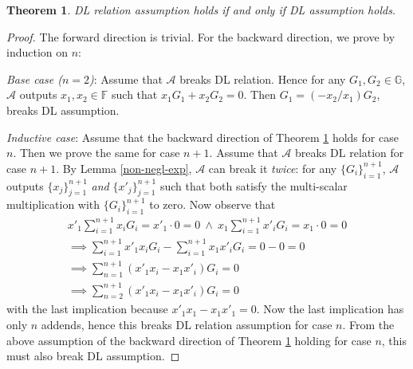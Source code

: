 \documentclass{article}
\newtheorem{theorem}{Theorem}[section]
\begin{document}
\begin{theorem}\label{equiv-demo}
DL relation assumption holds if and only if DL assumption holds.
\end{theorem}
\begin{proof}
The forward direction is trivial. For the backward direction, we prove by induction on $n$:

\textit{Base case ($n=2$)}: Assume that $\mathcal{A}$ breaks DL relation. Hence for any $G_1, G_2 \in \mathbb{G}$, $\mathcal{A}$ outputs $x_1, x_2 \in \mathbb{F}$ such that $x_1 G_1 + x_2 G_2 = 0$. Then $G_1 = (-x_2 / x_1) G_2$, breaks DL assumption.

\textit{Inductive case}: Assume that the backward direction of Theorem \ref{equiv-demo} holds for case $n$. Then we prove the same for case $n+1$. Assume that $\mathcal{A}$ breaks DL relation for case $n+1$. By Lemma \ref{non-negl-exp}, $\mathcal{A}$ can break it \textit{twice}: for any $\{G_i\}_{i=1}^{n+1}$, $\mathcal{A}$ outputs $\{x_j\}_{j=1}^{n+1}$ \textit{and} $\{x'_j\}_{j=1}^{n+1}$ such that both satisfy the multi-scalar multiplication with $\{G_i\}_{i=1}^{n+1}$ to zero. Now observe that
\begin{align*}
x'_1 \sum_{i=1}^{n+1} x_i G_i = x'_1 \cdot 0 = 0\ \wedge\ x_1 \sum_{i=1}^{n+1} x'_i G_i = x_1 \cdot 0 = 0 \\
\implies \sum_{i=1}^{n+1} x'_1 x_i G_i - \sum_{i=1}^{n+1} x_1 x'_i G_i = 0 - 0 = 0 \\
\implies \sum_{n=1}^{n+1} (x'_1 x_i - x_1 x'_i) G_i = 0 \\
\implies  \sum_{n=2}^{n+1} (x'_1 x_i - x_1 x'_i) G_i = 0
\end{align*}
with the last implication because $x'_1 x_1 - x_1 x'_1 = 0$. Now the last implication has only $n$ addends, hence this breaks DL relation assumption for case $n$. From the above assumption of the backward direction of Theorem \ref{equiv-demo} holding for case $n$, this must also break DL assumption.
\end{proof}


\end{document}
